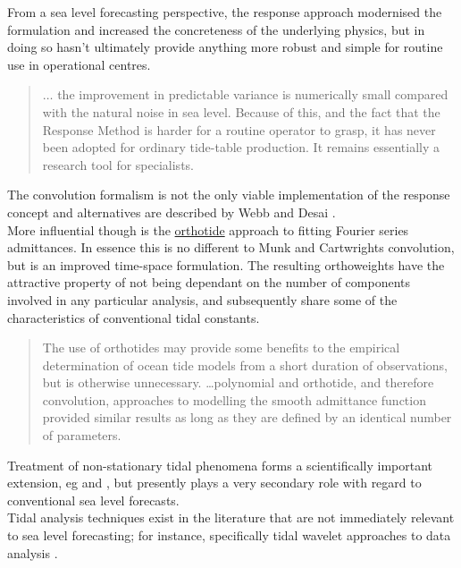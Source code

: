 From a sea level forecasting perspective, the response approach modernised the formulation and increased the concreteness of the underlying physics, but in doing so hasn't ultimately provide anything more robust and simple for routine use in operational centres.
\begin{quotation}
$\dots$ the improvement in predictable variance is numerically small compared with the natural noise in sea level.   Because of this, and the fact that the Response Method is harder for a routine operator to grasp, it has never been adopted for ordinary tide-table production. It remains essentially a research tool for specialists. \citep[pp 198]{Cartwright:2000tt} 
\end{quotation}


The convolution formalism is not the only viable implementation of the response concept and alternatives are described by Webb\cite{Webb:1974ke} and Desai \cite{Desai:1995je}.\\
More influential though is the \underline{orthotide} \citep {Groves:1975ky} approach to fitting Fourier series admittances.
In essence this is no different to Munk and Cartwrights convolution, but is an improved time-space formulation.  The resulting orthoweights have the attractive property of not being dependant on the number of components involved in any particular analysis, and subsequently share some of the characteristics of conventional tidal constants.
\begin{quotation}   
The use of orthotides may provide some benefits to the empirical determination of ocean tide models from a short duration of observations, but is otherwise unnecessary. \dots  polynomial and orthotide, and therefore convolution, approaches to modelling the smooth admittance function provided similar results as long as they are defined by an identical number of parameters.\citep{Desai:2006wo}
\end{quotation}


Treatment of non-stationary tidal phenomena forms a scientifically important extension, eg \citep{Colosi:2006va} and \citep{Ray:2011tj}, but presently plays a very secondary role with regard to conventional sea level forecasts.\\
Tidal analysis techniques exist in the literature that are not immediately relevant to sea level forecasting; for instance, specifically tidal wavelet approaches to data analysis \citep{Flinchem:2000kp}.

